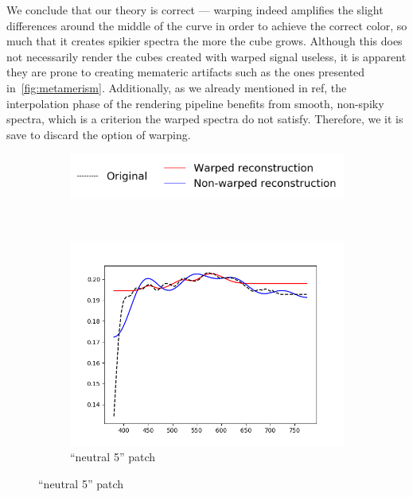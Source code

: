 We conclude that our theory is correct --- warping indeed amplifies the slight differences around the middle of the curve in order to achieve the correct color, so much that it creates spikier spectra the more the cube grows. Although this does not necessarily render the cubes created with warped signal useless, it is apparent they are prone to creating memateric artifacts such as the ones presented in~\cref{fig:metamerism}. Additionally, as we already mentioned in ref, the interpolation phase of the rendering pipeline benefits from smooth, non-spiky spectra, which is a criterion the warped spectra do not satisfy. Therefore, we it is save to discard the option of warping.






\begin{figure}[t]
	\centering
	\captionsetup[subfigure]{font=footnotesize,labelfont=footnotesize}
	\captionsetup[subfigure]{justification=centering}
	\begin{subfigure}[t]{0.60\textwidth}
		\includegraphics[width=\linewidth]{img/results_techniqueLegend.png}
	\end{subfigure} \\
	\begin{subfigure}[t]{0.45\textwidth}
		\includegraphics[width=\linewidth]{img/results_techniqueNeutral5.png}
		\caption{``neutral 5'' patch}

\end{subfigure}
\end{figure}
